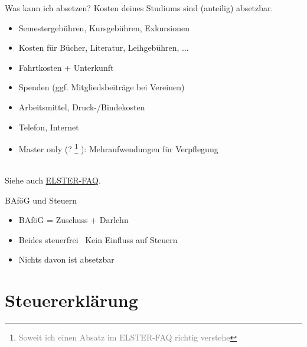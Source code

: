 \documentclass{beamer}
\newcommand{\n}{\hfill\\\vspace{0.25cm}}
\let\oldfootnote\footnote
\renewcommand{\footnote}[1]
{%
	\oldfootnote
	{
		\tiny
		\textcolor{gray}{#1}
	}%
}
\begin{document}
		\begin{frame}{Was kann ich absetzen?}
			Kosten deines Studiums sind (anteilig) absetzbar.\n
			\begin{itemize}
				\item Semestergebühren, Kursgebühren, Exkursionen
				\item Kosten für Bücher, Literatur, Leihgebühren, ...
				\item Fahrtkosten + Unterkunft
				\item Spenden (ggf. Mitgliedsbeiträge bei Vereinen)
				\item Arbeitsmittel, Druck-/Bindekosten
				\item Telefon, Internet
				\item Master only (?\footnote{Soweit ich einen Absatz im ELSTER-FAQ richtig verstehe}): Mehraufwendungen für Verpflegung
			\end{itemize}\n
			Siehe auch \href{https://www.elster.de/eportal/helpGlobal?themaGlobal=help_est_ufa_10_2020}{ELSTER-FAQ}.
		\end{frame}
	
		\begin{frame}{BAföG und Steuern}
			\begin{itemize}
				\item BAföG = Zuschuss + Darlehn
				\item Beides steuerfrei \textrightarrow\ Kein Einfluss auf Steuern
				\item Nichts davon ist absetzbar
			\end{itemize}
		\end{frame}
	
	\section{Steuererklärung}
	
		\begin{frame}
		\end{frame}
	
\end{document}
